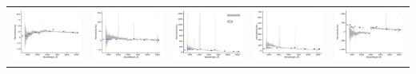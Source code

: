 \begin{center}
\begin{longtable}{l l l l l }
    \includegraphics[width=0.19\linewidth, clip]{Figs/Figs-lamost/spec-57719-EG012606S021203M01_sp16-150-STRIPE82-0031-049213.pdf} & \includegraphics[width=0.19\linewidth, clip]{Figs/Figs-lamost/spec-57746-KP114249S033242B01_sp11-099-SPLUS-n02s19-006979.pdf} & \includegraphics[width=0.19\linewidth, clip]{Figs/Figs-lamost/spec-57746-KP114249S033242B01_sp12-186-SPLUS-n02s20-017833.pdf} & \includegraphics[width=0.19\linewidth, clip]{Figs/Figs-lamost/spec-57747-EG020648N012631M01_sp04-174-STRIPE82-0046-031141.pdf} & \includegraphics[width=0.19\linewidth, clip]{Figs/Figs-lamost/spec-57747-EG020648N012631M01_sp05-005-STRIPE82-0047-031879.pdf} \\

\end{longtable}
\end{center}
